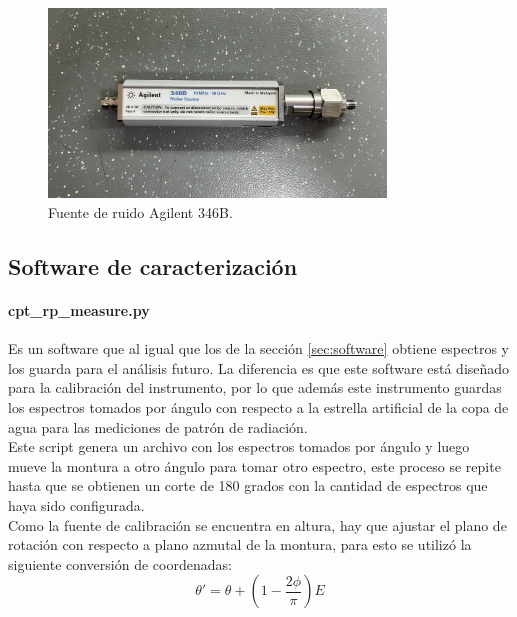 \begin{figure}
    \centering
    \includegraphics[width=0.8\textwidth]{img/fuenteRuido}
    \caption{Fuente de ruido Agilent 346B.}
    \label{fig:fuente_ruido}
\end{figure}

\subsection{Software de caracterización}

\paragraph{cpt\_rp\_measure.py} Es un software que al igual que los de la sección \ref{sec:software} obtiene espectros y los guarda para el análisis futuro. La diferencia es que este software está diseñado para la calibración del instrumento, por lo que además este instrumento guardas los espectros tomados por ángulo con respecto a la estrella artificial de la copa de agua para las mediciones de patrón de radiación.\\

Este script genera un archivo con los espectros tomados por ángulo y luego mueve la montura a otro ángulo para tomar otro espectro, este proceso se repite hasta que se obtienen un corte de 180 grados con la cantidad de espectros que haya sido configurada.\\

Como la fuente de calibración se encuentra en altura, hay que ajustar el plano de rotación con respecto a plano azmutal de la montura, para esto se utilizó la siguiente conversión de coordenadas:\\

\begin{equation}
    \theta' = \theta + \left(1- \frac{2\phi}{\pi}\right)E
\end{equation}

